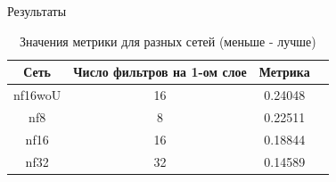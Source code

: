 \documentclass[12pt]{beamer}
\begin{document}
	\begin{frame}{Результаты}
		\begin{table}[h!]
			\begin{center}
				\begin{tabular}{|c|c|c|c|}
					\hline
					Сеть & Число фильтров на 1-ом слое & Метрика \\
					\hline
					nf16woU & 16 & 0.24048\\
					\hline
					nf8 & 8 & 0.22511\\
					\hline
					nf16 & 16 & 0.18844\\
					\hline
					nf32 & 32 & 0.14589\\
					\hline
				\end{tabular}
				\caption{Значения метрики для разных сетей (меньше - лучше)}
				\label{8-sand-trend2-metrics}
			\end{center}
		\end{table}
	\end{frame}
	
\end{document}

